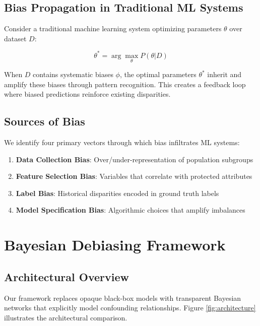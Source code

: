 \documentclass[11pt,a4paper]{article}
\theoremstyle{plain}
\theoremstyle{definition}
\theoremstyle{remark}
\begin{document}
\subsection{Bias Propagation in Traditional ML Systems}

Consider a traditional machine learning system optimizing parameters $\theta$ over dataset $D$:

\begin{equation}
\theta^* = \arg\max_{\theta} P(\theta|D)
\end{equation}

When $D$ contains systematic biases $\phi$, the optimal parameters $\theta^*$ inherit and amplify these biases through pattern recognition. This creates a feedback loop where biased predictions reinforce existing disparities.

\subsection{Sources of Bias}

We identify four primary vectors through which bias infiltrates ML systems:

\begin{enumerate}[label=(\arabic*)]
    \item \textbf{Data Collection Bias}: Over/under-representation of population subgroups
    \item \textbf{Feature Selection Bias}: Variables that correlate with protected attributes
    \item \textbf{Label Bias}: Historical disparities encoded in ground truth labels
    \item \textbf{Model Specification Bias}: Algorithmic choices that amplify imbalances
\end{enumerate}

\section{Bayesian Debiasing Framework}

\subsection{Architectural Overview}

Our framework replaces opaque black-box models with transparent Bayesian networks that explicitly model confounding relationships. Figure \ref{fig:architecture} illustrates the architectural comparison.
\end{document}
